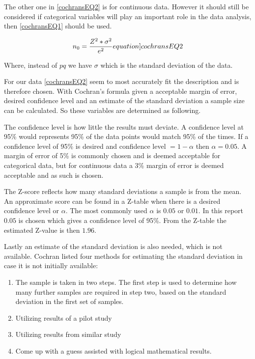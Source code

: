 The other one in \cref{cochransEQ2} is for continuous data. However it should still be considered if categorical variables will play an important role in the data analysis, then \cref*{cochransEQ1} should be used.

\begin{equation}
    n_0 = \frac{Z^2*\sigma^2}{e^2}
    \label[equation]{cochransEQ2}
\end{equation}

Where, instead of $pq$ we have $\sigma$ which is the standard deviation of the data.




For our data \cref{cochransEQ2} seem to most accurately fit the description and is therefore chosen. With Cochran's formula given a acceptable margin of error, desired confidence level and an estimate of the standard deviation a sample size can be calculated. So these variables are determined as following. 

The confidence level is how little the results must deviate. A confidence level at 95\% would represents 95\% of the data points would match 95\% of the times. If a confidence level of 95\% is desired and confidence level $= 1 - \alpha$ then $\alpha = 0.05$. 
A margin of error of 5\% is commonly chosen and is deemed acceptable for categorical data, but for continuous data a 3\% margin of error is deemed acceptable\cite{kotrlik2001organizational} and as such is chosen.

The Z-score reflects how many standard deviations a sample is from the mean. An approximate score can be found in a Z-table when there is a desired confidence level or $\alpha$. The most commonly used $\alpha$ is $0.05$ or $0.01$.\cite{kotrlik2001organizational} In this report $0.05$ is chosen which gives a confidence level of 95\%. From the Z-table the estimated Z-value is then $1.96$. 

Lastly an estimate of the standard deviation is also needed, which is not available. Cochran listed four methods for estimating the standard deviation in case it is not initially available:
\begin{enumerate}
    \item The sample is taken in two steps. The first step is used to determine how many further samples are required in step two, based on the standard deviation in the first set of samples.
    \item Utilizing results of a pilot study
    \item Utilizing results from similar study
    \item Come up with a guess assisted with logical mathematical results.
\end{enumerate}


